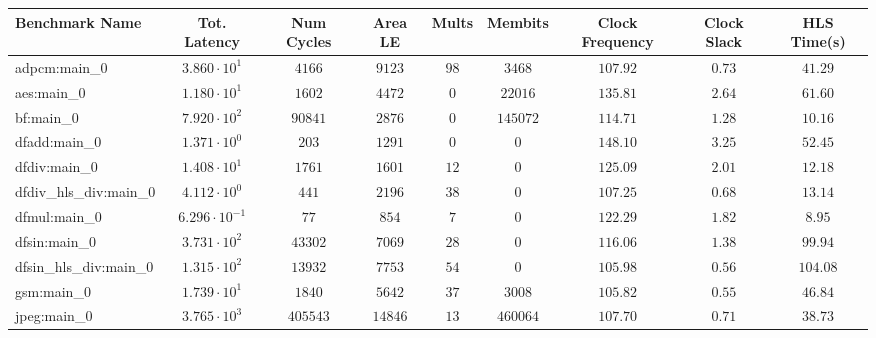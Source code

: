 \begin{tabular}{|l|c|c|c|c|c|c|c|c|}
\hline
Benchmark Name          & Tot. Latency            & Num Cycles & Area LE   & Mults   & Membits    & Clock Frequency & Clock Slack & HLS Time(s) \\
\hline
adpcm:main\_0           & $ 3.860 \cdot 10^{1}  $ & $ 4166   $ & $ 9123  $ & $ 98  $ & $ 3468   $ & $ 107.92      $ & $ 0.73    $ & $ 41.29   $ \\
aes:main\_0             & $ 1.180 \cdot 10^{1}  $ & $ 1602   $ & $ 4472  $ & $ 0   $ & $ 22016  $ & $ 135.81      $ & $ 2.64    $ & $ 61.60   $ \\
bf:main\_0              & $ 7.920 \cdot 10^{2}  $ & $ 90841  $ & $ 2876  $ & $ 0   $ & $ 145072 $ & $ 114.71      $ & $ 1.28    $ & $ 10.16   $ \\
dfadd:main\_0           & $ 1.371 \cdot 10^{0}  $ & $ 203    $ & $ 1291  $ & $ 0   $ & $ 0      $ & $ 148.10      $ & $ 3.25    $ & $ 52.45   $ \\
dfdiv:main\_0           & $ 1.408 \cdot 10^{1}  $ & $ 1761   $ & $ 1601  $ & $ 12  $ & $ 0      $ & $ 125.09      $ & $ 2.01    $ & $ 12.18   $ \\
dfdiv\_hls\_div:main\_0 & $ 4.112 \cdot 10^{0}  $ & $ 441    $ & $ 2196  $ & $ 38  $ & $ 0      $ & $ 107.25      $ & $ 0.68    $ & $ 13.14   $ \\
dfmul:main\_0           & $ 6.296 \cdot 10^{-1} $ & $ 77     $ & $ 854   $ & $ 7   $ & $ 0      $ & $ 122.29      $ & $ 1.82    $ & $ 8.95    $ \\
dfsin:main\_0           & $ 3.731 \cdot 10^{2}  $ & $ 43302  $ & $ 7069  $ & $ 28  $ & $ 0      $ & $ 116.06      $ & $ 1.38    $ & $ 99.94   $ \\
dfsin\_hls\_div:main\_0 & $ 1.315 \cdot 10^{2}  $ & $ 13932  $ & $ 7753  $ & $ 54  $ & $ 0      $ & $ 105.98      $ & $ 0.56    $ & $ 104.08  $ \\
gsm:main\_0             & $ 1.739 \cdot 10^{1}  $ & $ 1840   $ & $ 5642  $ & $ 37  $ & $ 3008   $ & $ 105.82      $ & $ 0.55    $ & $ 46.84   $ \\
jpeg:main\_0            & $ 3.765 \cdot 10^{3}  $ & $ 405543 $ & $ 14846 $ & $ 13  $ & $ 460064 $ & $ 107.70      $ & $ 0.71    $ & $ 38.73   $ \\

\end{tabular}
